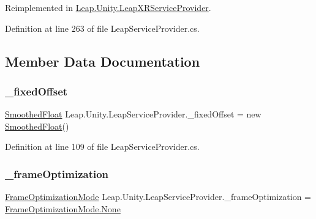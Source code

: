 Reimplemented in \mbox{\hyperlink{class_leap_1_1_unity_1_1_leap_x_r_service_provider_a17b936b12ed7aabdf54af577a4de7f29}{Leap.\+Unity.\+Leap\+X\+R\+Service\+Provider}}.



Definition at line 263 of file Leap\+Service\+Provider.\+cs.



\subsection{Member Data Documentation}
\mbox{\label{class_leap_1_1_unity_1_1_leap_service_provider_acc5d58cd24f2c8e6fdcfe3055b11c236}} 
\subsubsection{\texorpdfstring{\_fixedOffset}{\_fixedOffset}}
{\footnotesize\ttfamily \mbox{\hyperlink{class_leap_1_1_unity_1_1_smoothed_float}{Smoothed\+Float}} Leap.\+Unity.\+Leap\+Service\+Provider.\+\_\+fixed\+Offset = new \mbox{\hyperlink{class_leap_1_1_unity_1_1_smoothed_float}{Smoothed\+Float}}()\hspace{0.3cm}{\ttfamily [protected]}}



Definition at line 109 of file Leap\+Service\+Provider.\+cs.

\mbox{\label{class_leap_1_1_unity_1_1_leap_service_provider_a58ab122b5e6430d5fb98fccf7e600e54}} 
\subsubsection{\texorpdfstring{\_frameOptimization}{\_frameOptimization}}
{\footnotesize\ttfamily \mbox{\hyperlink{class_leap_1_1_unity_1_1_leap_service_provider_aded29faa9adf0b09e63a1659e5b0f82d}{Frame\+Optimization\+Mode}} Leap.\+Unity.\+Leap\+Service\+Provider.\+\_\+frame\+Optimization = \mbox{\hyperlink{class_leap_1_1_unity_1_1_leap_service_provider_aded29faa9adf0b09e63a1659e5b0f82da6adf97f83acf6453d4a6a4b1070f3754}{Frame\+Optimization\+Mode.\+None}}\hspace{0.3cm}{\ttfamily [protected]}}




